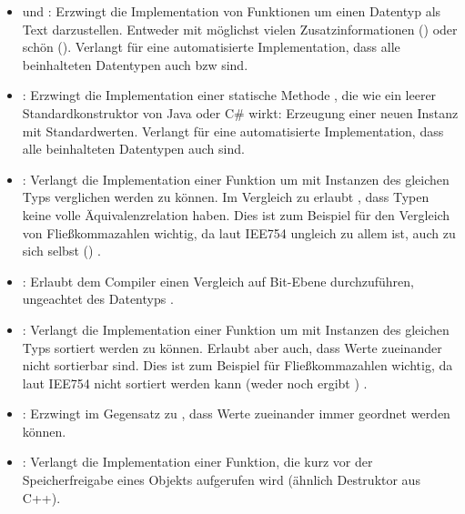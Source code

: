 \begin{itemize}
	\item {} und : Erzwingt die Implementation von Funktionen um einen Datentyp als Text darzustellen. Entweder mit möglichst vielen Zusatzinformationen () oder schön ().
	Verlangt für eine automatisierte Implementation, dass alle beinhalteten Datentypen auch  bzw  sind.
	
	\item {}: Erzwingt die Implementation einer statische Methode , die wie ein leerer Standardkonstruktor von Java oder C\# wirkt: Erzeugung einer neuen Instanz mit Standardwerten.
	Verlangt für eine automatisierte Implementation, dass alle beinhalteten Datentypen auch  sind.
	
	\item {}: Verlangt die Implementation einer Funktion um mit Instanzen des gleichen Typs verglichen werden zu können.
	Im Vergleich zu  erlaubt , dass Typen keine volle Äquivalenzrelation haben.
	Dies ist zum Beispiel für den Vergleich von Fließkommazahlen wichtig, da laut IEE754   ungleich zu allem ist, auch zu sich selbst () \cite{wiki:nan}\cite[272-275]{rust:orly_programming}\cite{rust:doc:partialeq}.
	
	\item {}: Erlaubt dem Compiler einen Vergleich auf Bit-Ebene durchzuführen, ungeachtet des Datentyps \cite{rust:doc:eq}.
	
	\item {}: Verlangt die Implementation einer Funktion um mit Instanzen des gleichen Typs sortiert werden zu können. Erlaubt aber auch, dass Werte zueinander nicht sortierbar sind.
	Dies ist zum Beispiel für Fließkommazahlen wichtig, da laut IEE754   nicht sortiert werden kann (weder  noch  ergibt ) \cite{wiki:nan}\cite[275-277]{rust:orly_programming}\cite{rust:doc:partialord}.
	
	\item {}: Erzwingt im Gegensatz zu , dass Werte zueinander immer geordnet werden können.
	
	\item {}: Verlangt die Implementation einer Funktion, die kurz vor der Speicherfreigabe eines Objekts aufgerufen wird (ähnlich Destruktor aus C++).
\end{itemize}

